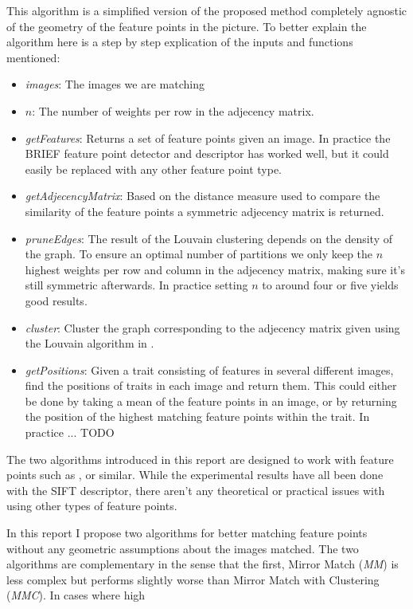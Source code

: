\documentclass{article}
\begin{document}
This algorithm is a simplified version of the proposed method completely 
agnostic of the geometry of the feature points in the picture. To better 
explain the algorithm here is a step by step explication of the inputs 
and functions mentioned:
\begin{itemize}
\item[]{\emph{images}: The images we are matching}
\item[]{\emph{$n$}: The number of weights per row in the adjecency 
matrix.}
\item[]{\emph{getFeatures}: Returns a set of feature points given an 
image. In practice the BRIEF\cite{calonder2010brief} feature point 
detector and descriptor has worked well, but it could easily be replaced 
with any other feature point type.} 
\item[]{\emph{getAdjecencyMatrix}: Based on the distance measure used to 
compare the similarity of the feature points a symmetric adjecency 
matrix is returned.}
\item[]{\emph{pruneEdges}: The result of the Louvain clustering depends 
on the density of the graph. To ensure an optimal number of partitions 
we only keep the $n$ highest weights per row and column in the adjecency 
matrix, making sure it's still symmetric afterwards. In practice setting 
$n$ to around four or five yields good results.}
\item[]{\emph{cluster}: Cluster the graph corresponding to the adjecency 
matrix given using the Louvain algorithm in \cite{blondel2008}.}
\item[]{\emph{getPositions}: Given a trait consisting of features in 
several different images, find the positions of traits in each image and 
return them. This could either be done by taking a mean of the feature 
points in an image, or by returning the position of the highest matching 
feature points within the trait. In practice ... TODO}
\end{itemize}

The two algorithms introduced in this report are designed to work with 
feature points such as ,  or similar. While the experimental results 
have all been done with the SIFT descriptor, there aren't any 
theoretical or practical issues with using other types of feature 
points. 

In this report I propose two algorithms for better matching feature 
points without any geometric assumptions about the images matched. The 
two algorithms are complementary in the sense that the first, Mirror 
Match (\emph{MM}) is less complex but performs slightly worse than 
Mirror Match with Clustering (\emph{MMC}). In cases where high 
\end{document}
